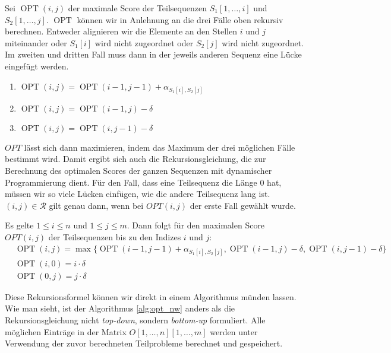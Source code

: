 Sei $\operatorname{OPT}(i,j)$ der maximale Score der Teilsequenzen $S_1[1,\dots,i]$ und $S_2[1,\dots,j]$. $\operatorname{OPT}$ können wir in Anlehnung an die drei Fälle oben rekursiv berechnen. Entweder alignieren wir die Elemente an den Stellen $i$ und $j$ miteinander oder $S_1[i]$ wird nicht zugeordnet oder $S_2[j]$ wird nicht zugeordnet. Im zweiten und dritten Fall muss dann in der jeweils anderen Sequenz eine Lücke eingefügt werden.

\begin{enumerate}[topsep=0pt,itemsep=-1ex,partopsep=1ex,parsep=1ex]
	\item $\operatorname{OPT}(i,j) = \operatorname{OPT}(i-1,j-1) + \alpha_{S_1[i],S_2[j]}$
	\item $\operatorname{OPT}(i,j) = \operatorname{OPT}(i-1,j) - \delta$
	\item $\operatorname{OPT}(i,j) = \operatorname{OPT}(i,j-1) - \delta$
\end{enumerate}

$OPT$ lässt sich dann maximieren, indem das Maximum der drei möglichen Fälle bestimmt wird. Damit ergibt sich auch die Rekursionsgleichung, die zur Berechnung des optimalen Scores der ganzen Sequenzen mit dynamischer Programmierung dient. Für den Fall, dass eine Teilsequenz die Länge 0 hat, müssen wir so viele Lücken einfügen, wie die andere Teilsequenz lang ist. $(i,j) \in \mathcal{R}$ gilt genau dann, wenn bei $OPT(i,j)$ der erste Fall gewählt wurde.

\begin{korollar}\label{kor:opt}
	Es gelte $1 \leq i \leq n$ und $1 \leq j \leq m$. Dann folgt für den maximalen Score $OPT(i,j)$ der Teilsequenzen bis zu den Indizes $i$ und $j$:
	\begin{equation*}
	\begin{split}
	&\operatorname{OPT}(i,j) = \max\{\operatorname{OPT}(i-1,j-1) + \alpha_{S_1[i],S_2[j]}, \operatorname{OPT}(i-1,j) - \delta, \operatorname{OPT}(i,j-1) - \delta\} \\
	&\operatorname{OPT}(i,0) = i\cdot \delta \\
	&\operatorname{OPT}(0,j) = j\cdot \delta 
	\end{split}
	\end{equation*}
\end{korollar}

Diese Rekursionsformel können wir direkt in einem Algorithmus münden lassen. Wie man sieht, ist der Algorithmus \ref{alg:opt_nw} anders als die Rekursionsgleichung nicht \emph{top-down}, sondern \emph{bottom-up} formuliert. Alle möglichen Einträge in der Matrix $O[1,\dots,n][1,\dots,m]$ werden unter Verwendung der zuvor berechneten Teilprobleme berechnet und gespeichert. 


